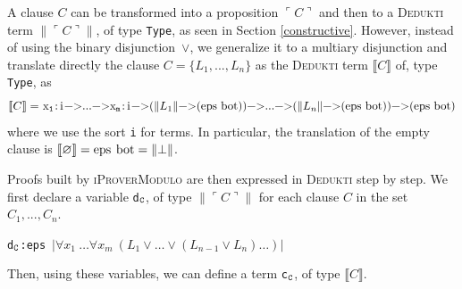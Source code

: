 \documentclass[english]{lipics}
\newcommand\lst[1]{{\rm \lstinline{#1}}}
\begin{document}
A clause $C$ can be transformed into a proposition $\ulcorner C
\urcorner$ and then to a \textsc{Dedukti} term $\| \ulcorner C
\urcorner \|$, of type \lst{Type}, as seen in Section
\ref{constructive}.  However, instead of using the binary
disjunction~$\vee$, we generalize it to a multiary disjunction and
translate directly the clause $C = \{L_1, ..., L_n\}$ as the
\textsc{Dedukti} term $\llbracket C \rrbracket$ of, type \lst{Type},
as
$$
\mbox{$\llbracket C \rrbracket =$
\lst{x}$_{\tt 1}$\lst{:i->...->x}$_{\tt m}$\lst{:i->(}$\|L_1\|$\lst{->(eps bot))->...->(}$\|L_n\|$\lst{ ->(eps bot))->(eps bot)}}
$$
where we use the sort \lst{i} for terms. In particular, the
translation of the empty clause is $\llbracket \varnothing \rrbracket
= \mbox{\lst{eps bot}} = \|\bot\|$.

Proofs built by
\textsc{iProverModulo} are then expressed in \textsc{Dedukti}
step by step. We first declare a variable \lst{d}$_{\tt C}$, of type
$\|\ulcorner C \urcorner\|$ for each clause $C$ in the set $C_1, ..., C_n$.
\begin{center}
\lst{d}$_{\tt C}$\lst{:eps}~$|\forall x_1~\dots\forall x_m~(L_1\vee \dots\vee(L_{n-1}\vee L_n)\dots)|$
\end{center}
Then, using these variables, we can define a term \lst{c}$_{\tt C}$,
of type $\llbracket C \rrbracket$.
\end{document}
